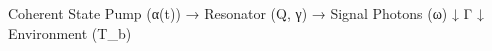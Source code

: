 Coherent State Pump (α(t)) → Resonator (Q, γ) → Signal Photons (ω)
                                      ↓
                                      Γ
                                      ↓
                                      Environment (T_b)